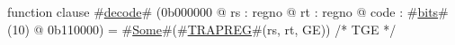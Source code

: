 function clause #\hyperref[zdecode]{decode}# (0b000000 @ rs : regno @ rt : regno @ code : #\hyperref[zbits]{bits}#(10) @ 0b110000) =
  #\hyperref[zSome]{Some}#(#\hyperref[zTRAPREG]{TRAPREG}#(rs, rt, GE)) /* TGE */
